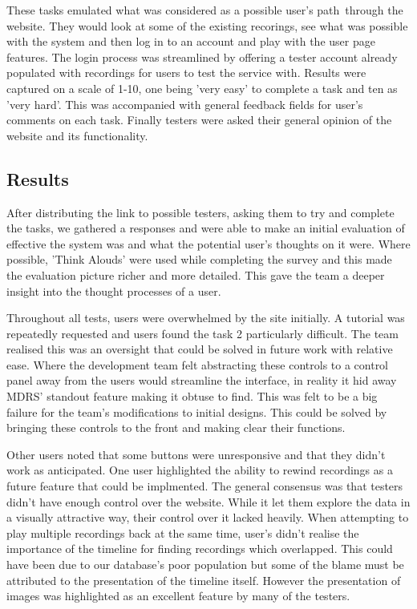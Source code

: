 \documentclass{l3proj}
\begin{document}
These tasks emulated what was considered as a possible user's path through the website. They would look at some of the existing recorings, see what was possible with the system and then log in to an account and play with the user page features. The login process was streamlined by offering a tester account already populated with recordings for users to test the service with. Results were captured on a scale of 1-10, one being 'very easy' to complete a task and ten as 'very hard'. This was accompanied with general feedback fields for user's comments on each task. Finally testers were asked their general opinion of the website and its functionality.

\subsection{Results}		After distributing the link to possible testers, asking them to try and complete the tasks, we gathered a responses and were able to make an initial evaluation of effective the system was and what the potential user's thoughts on it were. Where possible, 'Think Alouds' were used while completing the survey and this made the evaluation picture richer and more detailed. This gave the team a deeper insight into the thought processes of a user.

Throughout all tests, users were overwhelmed by the site initially. A tutorial was repeatedly requested and users found the task 2 particularly difficult. The team realised this was an oversight that could be solved in future work with relative ease. Where the development team felt abstracting these controls to a control panel away from the users would streamline the interface, in reality it hid away MDRS' standout feature making it obtuse to find. This was felt to be a big failure for the team's modifications to initial designs. This could be solved by bringing these controls to the front and making clear their functions.

Other users noted that some buttons were unresponsive and that they didn't work as anticipated. One user highlighted the ability to rewind recordings as a future feature that could be implmented. The general consensus was that testers didn't have enough control over the website. While it let them explore the data in a visually attractive way, their control over it lacked heavily. When attempting to play multiple recordings back at the same time, user's didn't realise the importance of the timeline for finding recordings which overlapped. This could have been due to our database's poor population but some of the blame must be attributed to the presentation of the timeline itself. However the presentation of images was highlighted as an excellent feature by many of the testers.
\end{document}
